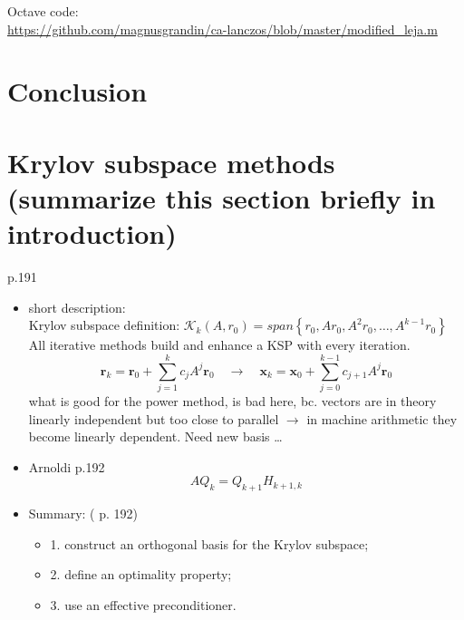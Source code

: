 \documentclass{scrartcl}
\begin{document}
Octave code:\\
\url{https://github.com/magnusgrandin/ca-lanczos/blob/master/modified_leja.m}
\fi

\section{Conclusion}

\section*{Krylov subspace methods (summarize this section briefly in introduction)}

\cite{Ascher:2011:FCN:2031413} p.191\\
\begin{itemize}
\item short description:\\
Krylov subspace definition: $\mathcal{K}_k(A, r_0) = span \left\{ r_0, Ar_0, A^2r_0,\ldots,A^{k-1}r_0 \right\}$\\

All iterative methods build and enhance a KSP with every iteration.
\begin{equation*}
\textbf{r}_k = \textbf{r}_0 + \sum_{j=1}^{k} c_jA^j\textbf{r}_0 \quad \to \quad \textbf{x}_k = \textbf{x}_0 + \sum_{j=0}^{k-1} c_{j+1}A^j\textbf{r}_0
\end{equation*}
what is good for the power method, is bad here, bc. vectors are in theory linearly independent but too close to parallel $\to$ in machine arithmetic they become linearly dependent. Need new basis \ldots 
\item Arnoldi \cite{Ascher:2011:FCN:2031413} p.192
\begin{equation*}
AQ_k = Q_{k+1}H_{k+1,k}
\end{equation*}
\item Summary: (\cite{Ascher:2011:FCN:2031413} p. 192)
	\begin{itemize}
	\item 1. construct an orthogonal basis for the Krylov subspace;
	\item 2. define an optimality property;
	\item 3. use an effective preconditioner.
	\end{itemize}
\end{itemize}
\end{document}
